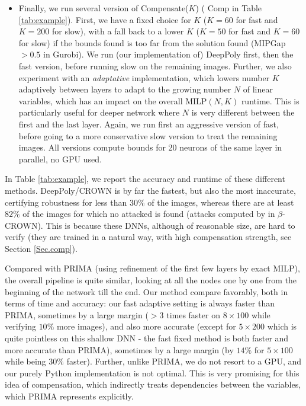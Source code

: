 \documentclass{llncs}
\newcommand{\MILP}{{\textrm{MILP}}}
\begin{document}
\begin{itemize}
	\item Finally, we run several version of Compensate($K$) ({\color{blue} Comp} in Table \ref{tab:example}). First, we have a fixed choice for $K$ ($K=60$ for fast and $K=200$ for slow), with a fall back to a lower $K$ ($K=50$ for fast and $K=60$ for slow) if the bounds found is too far from the solution found (MIPGap $>0.5$ in Gurobi). We run (our implementation of) DeepPoly first, then the fast version, before running slow on the remaining images.
	Further, we also experiment with an {\em adaptative} implementation, which lowers number $K$ adaptively between layers to adapt to the growing number $N$ of linear variables, which has an impact on the overall $\MILP(N,K)$ runtime. This is particularly useful for deeper network where $N$ is very different between the first and the last layer. Again, we run first an aggressive version of fast, before going to a more conservative slow version to treat the remaining images. All versions compute bounds for 20 neurons of the same layer in parallel, no GPU used.
\end{itemize}


In Table \ref{tab:example}, we report the accuracy and runtime of these different methods.
DeepPoly/CROWN is by far the fastest, but also the most inaccurate, certifying robustness for less than $30\%$ of the images, whereas there are at least $82\%$ of the images for which no attacked is found (attacks computed by \cite{attack} in $\beta$-CROWN).
This is because these DNNs, although of reasonable size, are hard to verify (they are trained in a natural way, with high compensation strength, see Section \ref{Sec.comp}).


Compared with PRIMA (using refinement of the first few layers by exact MILP), the overall pipeline is quite similar, looking at all the nodes one by one from the beginning of the network till the end. Our method compare favorably, both in terms of time and accuracy: our fast adaptive setting is always faster than PRIMA, sometimes by a large margin ($>3$ times faster on $8 \times 100$ while verifying $10\%$ more images), and also more accurate (except for $5 \times 200$ which is quite pointless on this shallow DNN - the fast fixed method is both faster and more accurate than PRIMA), sometimes by a large margin (by $14 \%$  for $5 \times 100$ while being $30\%$ faster). Further, unlike PRIMA, we do not resort to a GPU, and our purely Python implementation is not optimal. This is very promising for this idea of compensation, which indirectly treats dependencies between the variables, which PRIMA represents explicitly.
\end{document}
